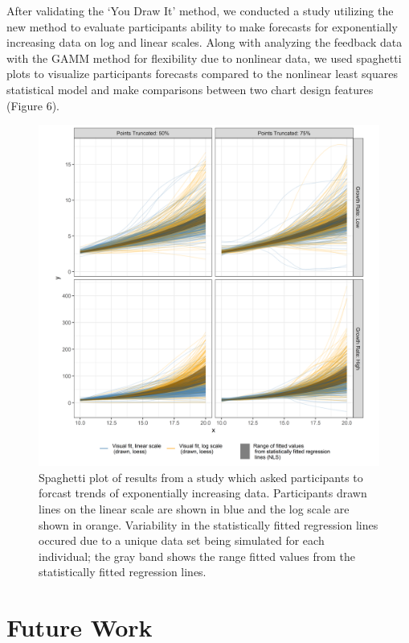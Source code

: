 \documentclass[
  letterpaper,
  DIV=11,
  numbers=noendperiod]{scrartcl}
\begin{document}
After validating the `You Draw It' method, we conducted a study
utilizing the new method to evaluate participants ability to make
forecasts for exponentially increasing data on log and linear scales.
Along with analyzing the feedback data with the GAMM method for
flexibility due to nonlinear data, we used spaghetti plots to visualize
participants forecasts compared to the nonlinear least squares
statistical model and make comparisons between two chart design features
(Figure 6).

\begin{figure}[ht]
\begin{center}
\centerline{\includegraphics[width=\columnwidth]{images/exponential-yloess-spaghetti-plot-2-1}}
\caption{Spaghetti plot of results from a study which asked participants to forcast trends of exponentially increasing data. Participants drawn lines on the linear scale are shown in blue and the log scale are shown in orange. Variability in the statistically fitted regression lines occured due to a unique data set being simulated for each individual; the gray band shows the range fitted values from the statistically fitted regression lines.}
\label{exponential-yloess-spaghetti-plot-2-1}
\end{center}
\end{figure}

\hypertarget{future-work}{%
\section{Future Work}\label{future-work}}
\end{document}
